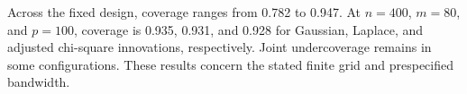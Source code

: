 Across the fixed design, coverage ranges from 0.782 to 0.947. At $n=400$, $m=80$, and $p=100$, coverage is 0.935, 0.931, and 0.928 for Gaussian, Laplace, and adjusted chi-square innovations, respectively. Joint undercoverage remains in some configurations. These results concern the stated finite grid and prespecified bandwidth.
